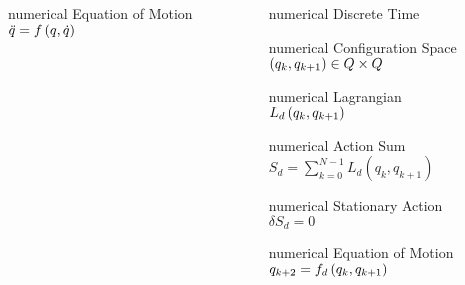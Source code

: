 \begin{frame}
\begin{columns}[c]
\begin{column}{0.5\textwidth}
			\begin{beamercolorbox}[wd=0.8\columnwidth,sep=0.05cm,center]{numerical} 
				Equation of Motion \\
				\( \ddot{q} = f \left( q, \dot{q}  \right) \)
			\end{beamercolorbox}
		\end{column}
		\pause
		\begin{column}{0.5\textwidth}
			\centering
			\begin{beamercolorbox}[wd=0.8\columnwidth,sep=0.05cm,center]{numerical} Discrete Time \end{beamercolorbox}
			\begin{beamercolorbox}[wd=0.8\columnwidth,sep=0.05cm,center]{numerical} 
				Configuration Space \\
				\( \left( q_k, q_{k+1}  \right) \in Q \times Q \)
			\end{beamercolorbox}
			\begin{beamercolorbox}[wd=0.8\columnwidth,sep=0.05cm,center]{numerical} 
				Lagrangian \\
				\( L_d\left( q_k, q_{k+1} \right) \)
			\end{beamercolorbox}
			\begin{beamercolorbox}[wd=0.8\columnwidth,sep=0.05cm,center]{numerical} 
				Action Sum \\
				\( S_d = \sum_{k=0}^{N-1} L_d(q_k, q_{k+1}) \)
			\end{beamercolorbox}
			\begin{beamercolorbox}[wd=0.8\columnwidth,sep=0.05cm,center]{numerical} 
				Stationary Action \\
				\( \delta S_d = 0 \)
			\end{beamercolorbox}
			\begin{beamercolorbox}[wd=0.8\columnwidth,sep=0.05cm,center]{numerical} 
				Equation of Motion \\
				\( q_{k+2} = f_d \left( q_k, q_{k+1}  \right) \)
			\end{beamercolorbox}
		\end{column}
	\end{columns}

\end{frame}%

